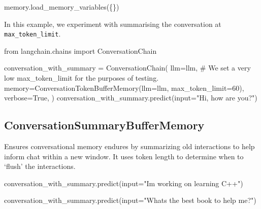 \documentclass[
  letterpaper,
  DIV=11,
  numbers=noendperiod]{scrreprt}
\newenvironment{Shaded}{\begin{snugshade}}{\end{snugshade}}
\newcommand{\BuiltInTok}[1]{\textcolor[rgb]{0.00,0.23,0.31}{#1}}
\newcommand{\CommentTok}[1]{\textcolor[rgb]{0.37,0.37,0.37}{#1}}
\newcommand{\DecValTok}[1]{\textcolor[rgb]{0.68,0.00,0.00}{#1}}
\newcommand{\ImportTok}[1]{\textcolor[rgb]{0.00,0.46,0.62}{#1}}
\newcommand{\NormalTok}[1]{\textcolor[rgb]{0.00,0.23,0.31}{#1}}
\newcommand{\OperatorTok}[1]{\textcolor[rgb]{0.37,0.37,0.37}{#1}}
\newcommand{\StringTok}[1]{\textcolor[rgb]{0.13,0.47,0.30}{#1}}
\newcommand{\VariableTok}[1]{\textcolor[rgb]{0.07,0.07,0.07}{#1}}
\begin{document}
\begin{Shaded}
\begin{Highlighting}[]
\NormalTok{memory.load\_memory\_variables(\{\})}
\end{Highlighting}
\end{Shaded}

In this example, we experiment with summarising the conversation at
\texttt{max\_token\_limit}.

\begin{Shaded}
\begin{Highlighting}[]
\ImportTok{from}\NormalTok{ langchain.chains }\ImportTok{import}\NormalTok{ ConversationChain}

\NormalTok{conversation\_with\_summary }\OperatorTok{=}\NormalTok{ ConversationChain(}
\NormalTok{    llm}\OperatorTok{=}\NormalTok{llm,}
    \CommentTok{\# We set a very low max\_token\_limit for the purposes of testing.}
\NormalTok{    memory}\OperatorTok{=}\NormalTok{ConversationTokenBufferMemory(llm}\OperatorTok{=}\NormalTok{llm, max\_token\_limit}\OperatorTok{=}\DecValTok{60}\NormalTok{),}
\NormalTok{    verbose}\OperatorTok{=}\VariableTok{True}\NormalTok{,}
\NormalTok{)}
\NormalTok{conversation\_with\_summary.predict(}\BuiltInTok{input}\OperatorTok{=}\StringTok{"Hi, how are you?"}\NormalTok{)}
\end{Highlighting}
\end{Shaded}

\hypertarget{conversationsummarybuffermemory}{%
\subsection{ConversationSummaryBufferMemory}\label{conversationsummarybuffermemory}}

Ensures conversational memory endures by summarizing old interactions to
help inform chat within a new window. It uses token length to determine
when to `flush' the interactions.

\begin{Shaded}
\begin{Highlighting}[]
\NormalTok{conversation\_with\_summary.predict(}\BuiltInTok{input}\OperatorTok{=}\StringTok{"I\textquotesingle{}m working on learning C++"}\NormalTok{)}
\end{Highlighting}
\end{Shaded}

\begin{Shaded}
\begin{Highlighting}[]
\NormalTok{conversation\_with\_summary.predict(}\BuiltInTok{input}\OperatorTok{=}\StringTok{"What\textquotesingle{}s the best book to help me?"}\NormalTok{)}
\end{Highlighting}
\end{Shaded}
\end{document}
